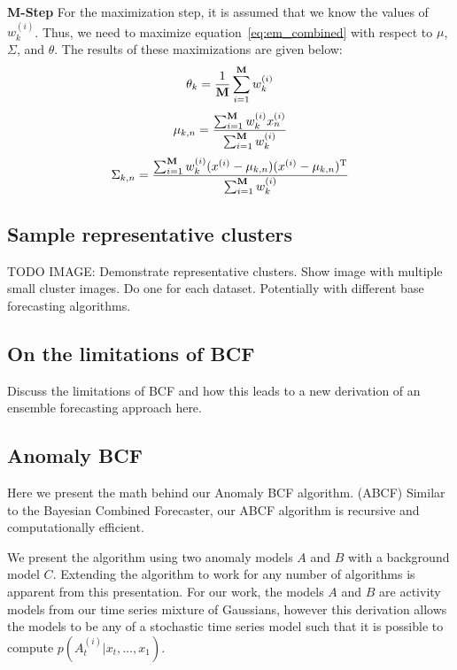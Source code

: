 \textbf{M-Step}
For the maximization step, it is assumed that we know the values of $w_{k}^{(i)}$.  Thus, we need to maximize equation~\ref{eq:em_combined} with respect to $\mu$,  $\Sigma$, and $\theta$.
The results of these maximizations are given below:
\begin{equation}
\theta_{k} = \frac{1}{{\bf M}}\sum_{i = 1}^{{\bf M}}w_{k}^{(i)}
\end{equation}
\begin{equation}
\mu_{k, n} = \frac{\sum_{i = 1}^{{\bf M}}w_{k}^{(i)}x^{(i)}_{n}}{\sum_{i = 1}^{{\bf M}}w_{k}^{(i)}}
\end{equation}
\begin{equation}
\Sigma_{k, n} = \frac{\sum_{i = 1}^{{\bf M}}w_{k}^{(i)}(x^{(i)} - \mu_{k, n})(x^{(i)} - \mu_{k, n})^{\mathrm{T}}}{\sum_{i = 1}^{{\bf M}}w_{k}^{(i)}}
\end{equation}

\subsection{Sample representative clusters}
TODO IMAGE: Demonstrate representative clusters.  Show image with multiple small cluster images.  Do one for each dataset.  Potentially with different base forecasting algorithms.

\subsection{On the limitations of BCF}
Discuss the limitations of BCF and how this leads to a new derivation of an ensemble forecasting approach here.

\subsection{Anomaly BCF}
Here we present the math behind our Anomaly BCF algorithm. (ABCF)  Similar to the Bayesian Combined Forecaster, our ABCF algorithm is recursive and computationally efficient.  

We present the algorithm using two anomaly models $A$ and $B$ with a background model $C$.  Extending the algorithm to work for any number of algorithms is apparent from this presentation.  For our work, the models $A$ and $B$ are activity models from our time series mixture of Gaussians, however this derivation allows the models to be any of a stochastic time series model such that it is possible to compute $p(A^{(i)}_{t}|x_{t}, \ldots, x_{1})$.

